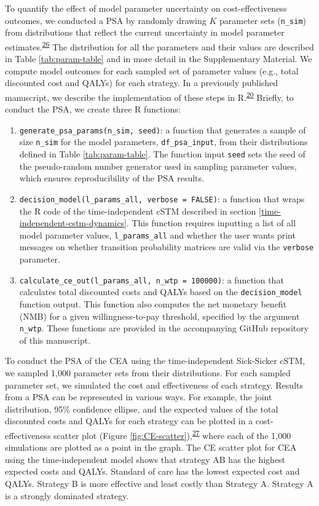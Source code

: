 \documentclass[
]{article}
\begin{document}
To quantify the effect of model parameter uncertainty on cost-effectiveness outcomes, we conducted a PSA by randomly drawing \(K\) parameter sets (\texttt{n\_sim}) from distributions that reflect the current uncertainty in model parameter estimates.\textsuperscript{\protect\hyperlink{ref-Briggs2012}{26}} The distribution for all the parameters and their values are described in Table \ref{tab:param-table} and in more detail in the Supplementary Material. We compute model outcomes for each sampled set of parameter values (e.g., total discounted cost and QALYs) for each strategy. In a previously published manuscript, we describe the implementation of these steps in R.\textsuperscript{\protect\hyperlink{ref-Alarid-Escudero2019e}{20}} Briefly, to conduct the PSA, we create three R functions:

\begin{enumerate}
\def\labelenumi{\arabic{enumi}.}
\item
  \texttt{generate\_psa\_params(n\_sim,\ seed)}: a function that generates a sample of size \texttt{n\_sim} for the model parameters, \texttt{df\_psa\_input}, from their distributions defined in Table \ref{tab:param-table}. The function input \texttt{seed} sets the seed of the pseudo-random number generator used in sampling parameter values, which ensures reproducibility of the PSA results.
\item
  \texttt{decision\_model(l\_params\_all,\ verbose\ =\ FALSE)}: a function that wraps the R code of the time-independent cSTM described in section \ref{time-independent-cstm-dynamics}. This function requires inputting a list of all model parameter values, \texttt{l\_params\_all} and whether the user wants print messages on whether transition probability matrices are valid via the \texttt{verbose} parameter.
\item
  \texttt{calculate\_ce\_out(l\_params\_all,\ n\_wtp\ =\ 100000)}: a function that calculates total discounted costs and QALYs based on the \texttt{decision\_model} function output. This function also computes the net monetary benefit (NMB) for a given willingness-to-pay threshold, specified by the argument \texttt{n\_wtp}.
  These functions are provided in the accompanying GitHub repository of this manuscript.
\end{enumerate}

To conduct the PSA of the CEA using the time-independent Sick-Sicker cSTM, we sampled 1,000 parameter sets from their distributions. For each sampled parameter set, we simulated the cost and effectiveness of each strategy. Results from a PSA can be represented in various ways. For example, the joint distribution, 95\% confidence ellipse, and the expected values of the total discounted costs and QALYs for each strategy can be plotted in a cost-effectiveness scatter plot (Figure \ref{fig:CE-scatter}),\textsuperscript{\protect\hyperlink{ref-Briggs2002}{27}} where each of the 1,000 simulations are plotted as a point in the graph. The CE scatter plot for CEA using the time-independent model shows that strategy AB has the highest expected costs and QALYs. Standard of care has the lowest expected cost and QALYs. Strategy B is more effective and least costly than Strategy A. Strategy A is a strongly dominated strategy.
\end{document}
